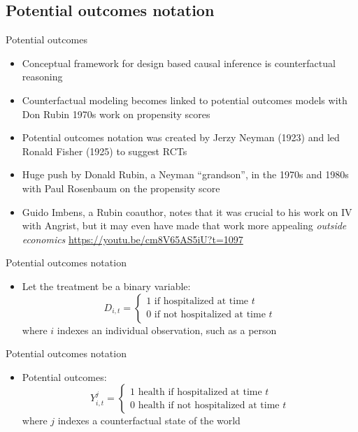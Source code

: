 \documentclass{beamer}
\begin{document}
\subsection{Potential outcomes notation}

\begin{frame}{Potential outcomes}

\begin{itemize}
\item Conceptual framework for design based causal inference is counterfactual reasoning
\item Counterfactual modeling becomes linked to potential outcomes models with Don Rubin 1970s work on propensity scores
\item Potential outcomes notation was created by Jerzy Neyman (1923) and led Ronald Fisher (1925) to suggest RCTs
\item Huge push by Donald Rubin, a Neyman ``grandson'', in the 1970s and 1980s with Paul Rosenbaum on the propensity score
\item Guido Imbens, a Rubin coauthor, notes that it was crucial to his work on IV with Angrist, but it may even have made that work more appealing \emph{outside economics}
\url{https://youtu.be/cm8V65AS5iU?t=1097}

\end{itemize}

\end{frame}




\begin{frame}{Potential outcomes notation}

  \begin{itemize}
    \item Let the treatment be a binary variable: $$D_{i,t} =\begin{cases} 1 \text{ if hospitalized at time $t$} \\ 0 \text{ if not hospitalized at time $t$} \end{cases}$$where $i$ indexes an individual observation, such as a person
  \end{itemize}
\end{frame}

\begin{frame}{Potential outcomes notation}

  \begin{itemize}
    \item Potential outcomes: $$Y_{i,t}^j =\begin{cases} 1 \text{ health if hospitalized at time $t$} \\ 0 \text{ health if not hospitalized at time $t$} \end{cases}$$where $j$ indexes a counterfactual state of the world
  \end{itemize}
\end{frame}
\end{document}

